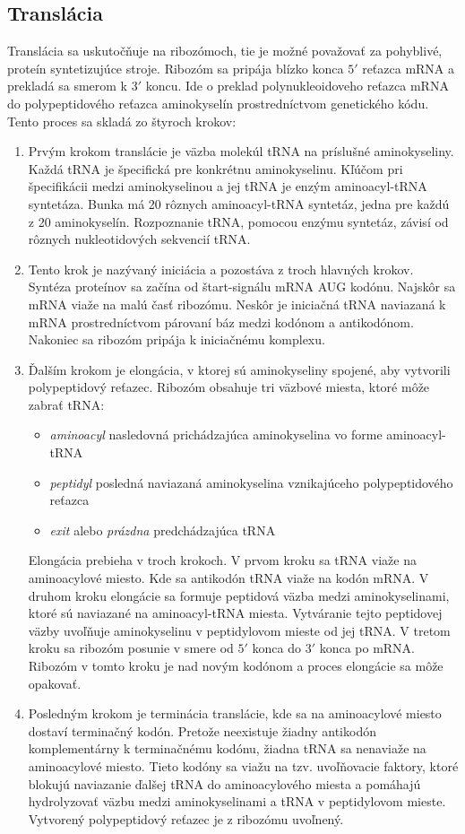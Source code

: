 \subsection{Translácia}
Translácia sa uskutočňuje na ribozómoch, tie je možné považovať za pohyblivé, proteín syntetizujúce stroje. Ribozóm sa pripája blízko konca $5'$
reťazca mRNA a prekladá sa smerom k $3'$ koncu. Ide o preklad polynukleoidoveho reťazca mRNA do polypeptidového reťazca aminokyselín prostredníctvom genetického kódu. Tento proces sa skladá zo štyroch krokov:
\begin{enumerate}
\item Prvým krokom translácie je väzba molekúl tRNA na príslušné aminokyseliny. Každá tRNA je špecifická pre konkrétnu aminokyselinu. Kľúčom pri špecifikácii medzi aminokyselinou a jej tRNA je enzým aminoacyl-tRNA syntetáza. Bunka má 20 rôznych aminoacyl-tRNA syntetáz, jedna pre každú z 20 aminokyselín. Rozpoznanie tRNA, pomocou enzýmu syntetáz, závisí od rôznych nukleotidových sekvencií tRNA. 
\item Tento krok je nazývaný iniciácia a pozostáva z troch hlavných krokov. Syntéza proteínov sa začína od štart-signálu mRNA AUG kodónu. Najskôr sa mRNA viaže na malú časť ribozómu. Neskôr je iniciačná tRNA naviazaná k mRNA prostredníctvom párovaní báz medzi kodónom a
antikodónom. Nakoniec sa ribozóm pripája k iniciačnému komplexu.
\item Ďalším krokom je elongácia, v ktorej sú aminokyseliny spojené, aby vytvorili polypeptidový reťazec. Ribozóm obsahuje tri väzbové miesta, ktoré môže zabrať tRNA:\begin{itemize}
\item \textit{aminoacyl} nasledovná prichádzajúca aminokyselina vo forme aminoacyl-tRNA
\item \textit{peptidyl} posledná naviazaná aminokyselina vznikajúceho polypeptidového reťazca
\item \textit{exit} alebo \textit{prázdna} predchádzajúca tRNA
\end{itemize} Elongácia prebieha v troch krokoch. V prvom kroku sa tRNA viaže na aminoacylové miesto. Kde sa antikodón tRNA viaže na kodón mRNA. V druhom kroku elongácie sa formuje peptidová väzba medzi aminokyselinami, ktoré sú naviazané na aminoacyl-tRNA miesta. Vytváranie tejto peptidovej väzby uvoľňuje aminokyselinu v peptidylovom mieste od jej tRNA. V tretom kroku sa ribozóm posunie v smere od $5'$ konca do $3'$ konca po mRNA. Ribozóm v tomto kroku je nad novým kodónom a proces elongácie sa môže opakovať.
\item Posledným krokom je terminácia translácie, kde sa na aminoacylové miesto dostaví terminačný kodón. Pretože neexistuje žiadny antikodón komplementárny k terminačnému kodónu, žiadna tRNA sa nenaviaže na aminoacylové miesto. Tieto kodóny sa viažu na tzv. uvoľňovacie faktory, ktoré blokujú naviazanie ďalšej tRNA do aminoacylového miesta a pomáhajú hydrolyzovať väzbu medzi aminokyselinami a tRNA v peptidylovom mieste. Vytvorený polypeptidový reťazec je z ribozómu uvoľnený.
\end{enumerate} 


